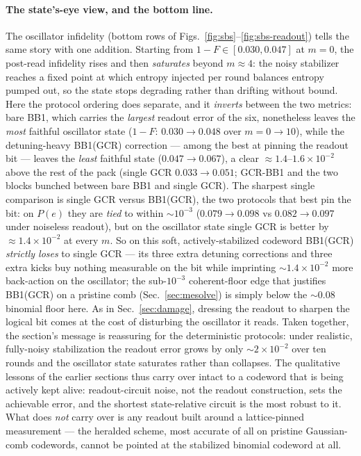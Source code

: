 \documentclass[11pt]{article}
\begin{document}
\paragraph{The state's-eye view, and the bottom line.} The oscillator infidelity
(bottom rows of Figs.~\ref{fig:sbs}--\ref{fig:sbs-readout}) tells the same story with one
addition. Starting from $1-F\in[0.030,0.047]$ at $m=0$, the post-read infidelity rises and then
\emph{saturates} beyond $m\approx4$: the noisy stabilizer reaches a fixed point at which entropy
injected per round balances entropy pumped out, so the state stops degrading rather than drifting
without bound. Here the protocol ordering does separate, and it \emph{inverts} between the two
metrics: bare BB1, which carries the \emph{largest} readout error of the six, nonetheless leaves
the \emph{most} faithful oscillator state ($1-F$: $0.030\!\to\!0.048$ over $m=0\!\to\!10$), while the
detuning-heavy BB1(GCR) correction --- among the best at pinning the readout bit --- leaves the
\emph{least} faithful state ($0.047\!\to\!0.067$), a clear $\approx\!1.4$--$1.6\times10^{-2}$ above
the rest of the pack (single GCR $0.033\!\to\!0.051$; GCR-BB1 and the two blocks bunched between bare
BB1 and single GCR). The sharpest single comparison is single GCR versus BB1(GCR), the two protocols
that best pin the bit: on $P(e)$ they are \emph{tied} to within $\sim\!10^{-3}$
($0.079\!\to\!0.098$ vs $0.082\!\to\!0.097$ under noiseless readout), but on the oscillator state
single GCR is better by $\approx\!1.4\times10^{-2}$ at every $m$. So on this soft, actively-stabilized
codeword BB1(GCR) \emph{strictly loses} to single GCR --- its three extra detuning corrections and
three extra kicks buy nothing measurable on the bit while imprinting $\sim\!1.4\times10^{-2}$ more
back-action on the oscillator; the sub-$10^{-3}$ coherent-floor edge that justifies BB1(GCR) on a
pristine comb (Sec.~\ref{sec:mesolve}) is simply below the $\sim\!0.08$ binomial floor here. As in
Sec.~\ref{sec:damage}, dressing the readout to sharpen the logical bit comes at the cost of
disturbing the oscillator it reads. Taken
together, the section's message is reassuring for the deterministic protocols: under realistic,
fully-noisy stabilization the readout error grows by only $\sim2\times10^{-2}$ over ten rounds and
the oscillator state saturates rather than collapses. The qualitative lessons of the earlier
sections thus carry over intact to a codeword that is being actively kept alive: readout-circuit
noise, not the readout construction, sets the achievable error, and the shortest state-relative
circuit is the most robust to it. What does \emph{not} carry over is any readout built around a
lattice-pinned measurement --- the heralded scheme, most accurate of all on pristine Gaussian-comb
codewords, cannot be pointed at the stabilized binomial codeword at all.
\end{document}
